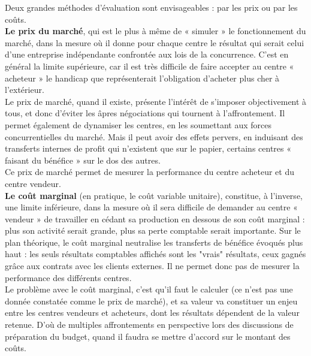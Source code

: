 \documentclass{kaobook}
\begin{document}
Deux grandes méthodes d’évaluation sont envisageables : par les prix ou par les coûts.\\

\textbf{Le prix du marché}, qui est le plus à même de « simuler » le fonctionnement du marché, dans la mesure où il donne pour chaque centre le résultat qui serait celui d’une entreprise indépendante confrontée aux lois de la concurrence. C’est en général la limite supérieure, car il est très difficile de faire accepter au centre « acheteur » le handicap que représenterait l’obligation d’acheter plus cher à l’extérieur.\\
Le prix de marché, quand il existe, présente l’intérêt de s’imposer objectivement à tous, et donc d’éviter les âpres négociations qui tournent à l’affrontement. Il permet également de dynamiser les centres, en les soumettant aux forces concurrentielles du marché. Mais il peut avoir des effets pervers, en induisant des transferts internes de profit qui n’existent que sur le papier, certains centres « faisant du bénéfice » sur le dos des autres.\\
Ce prix de marché permet de mesurer la performance du centre acheteur et du centre vendeur.\\

\textbf{Le coût marginal} (en pratique, le coût variable unitaire), constitue, à l’inverse, une limite inférieure, dans la mesure où il sera difficile de demander au centre « vendeur » de travailler en cédant sa production en dessous de son coût marginal : plus son activité serait grande, plus sa perte comptable serait importante. Sur le plan théorique, le coût marginal neutralise les transferts de bénéfice évoqués plus haut : les seuls résultats comptables affichés sont les "vrais" résultats, ceux gagnés grâce aux contrats avec les clients externes. Il ne permet donc pas de mesurer la performance des différents centres.\\
Le problème avec le coût marginal, c’est qu’il faut le calculer (ce n’est pas une donnée constatée comme le prix de marché), et sa valeur va constituer un enjeu entre les centres vendeurs et acheteurs, dont les résultats dépendent de la valeur retenue. D’où de multiples affrontements en perspective lors des discussions de préparation du budget, quand il faudra se mettre d’accord sur le montant des coûts.\\
\end{document}
